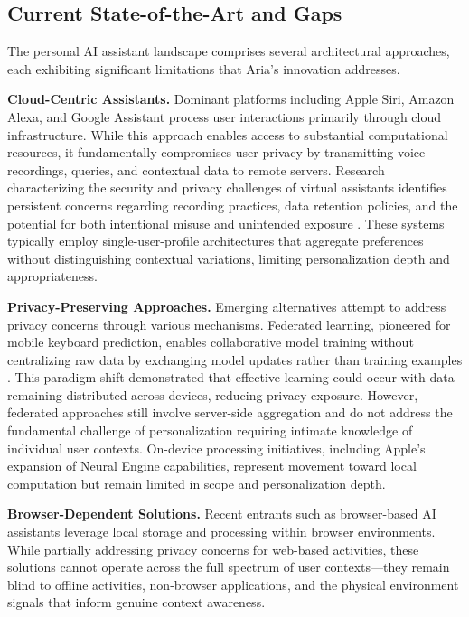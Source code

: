 \documentclass[11pt]{article}
\begin{document}
\vspace*{-8pt}
\subsection{Current State-of-the-Art and Gaps}
\vspace*{-8pt}
The personal AI assistant landscape comprises several architectural approaches, each exhibiting significant limitations that Aria's innovation addresses.

\textbf{Cloud-Centric Assistants.} Dominant platforms including Apple Siri, Amazon Alexa, and Google Assistant process user interactions primarily through cloud infrastructure. While this approach enables access to substantial computational resources, it fundamentally compromises user privacy by transmitting voice recordings, queries, and contextual data to remote servers. Research characterizing the security and privacy challenges of virtual assistants identifies persistent concerns regarding recording practices, data retention policies, and the potential for both intentional misuse and unintended exposure \cite{edu2021security}. These systems typically employ single-user-profile architectures that aggregate preferences without distinguishing contextual variations, limiting personalization depth and appropriateness.

\textbf{Privacy-Preserving Approaches.} Emerging alternatives attempt to address privacy concerns through various mechanisms. Federated learning, pioneered for mobile keyboard prediction, enables collaborative model training without centralizing raw data by exchanging model updates rather than training examples \cite{mcmahan2017communication}. This paradigm shift demonstrated that effective learning could occur with data remaining distributed across devices, reducing privacy exposure. However, federated approaches still involve server-side aggregation and do not address the fundamental challenge of personalization requiring intimate knowledge of individual user contexts. On-device processing initiatives, including Apple's expansion of Neural Engine capabilities, represent movement toward local computation but remain limited in scope and personalization depth.

\textbf{Browser-Dependent Solutions.} Recent entrants such as browser-based AI assistants leverage local storage and processing within browser environments. While partially addressing privacy concerns for web-based activities, these solutions cannot operate across the full spectrum of user contexts---they remain blind to offline activities, non-browser applications, and the physical environment signals that inform genuine context awareness.
\end{document}
